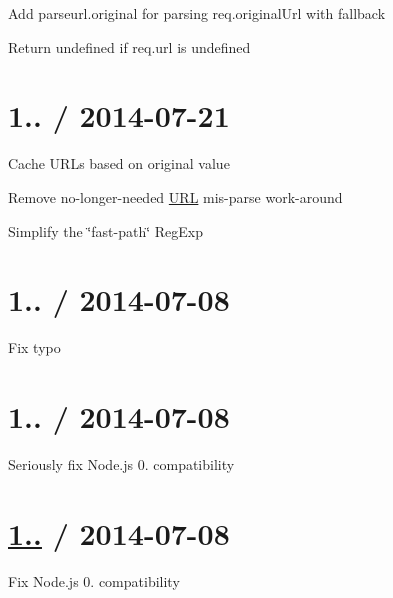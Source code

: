 
\begin{DoxyItemize}
\item Add {\ttfamily parseurl.\+original} for parsing {\ttfamily req.\+original\+Url} with fallback
\item Return {\ttfamily undefined} if {\ttfamily req.\+url} is {\ttfamily undefined}
\end{DoxyItemize}

\section*{1.. / 2014-\/07-\/21 }


\begin{DoxyItemize}
\item Cache U\+R\+Ls based on original value
\item Remove no-\/longer-\/needed \hyperlink{struct_u_r_l}{U\+R\+L} mis-\/parse work-\/around
\item Simplify the \char`\"{}fast-\/path\char`\"{} {\ttfamily Reg\+Exp}
\end{DoxyItemize}

\section*{1.. / 2014-\/07-\/08 }


\begin{DoxyItemize}
\item Fix typo
\end{DoxyItemize}

\section*{1.. / 2014-\/07-\/08 }


\begin{DoxyItemize}
\item Seriously fix Node.\+js 0. compatibility
\end{DoxyItemize}

\section*{\hyperlink{namespace1_1_11_1_11}{1..} / 2014-\/07-\/08 }


\begin{DoxyItemize}
\item Fix Node.\+js 0. compatibility
\end{DoxyItemize}

